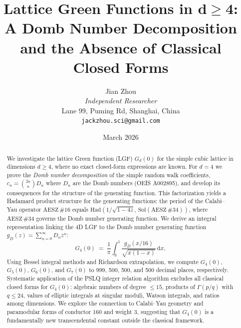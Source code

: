 \documentclass[12pt,a4paper]{article}
\numberwithin{equation}{section}
\theoremstyle{plain}
\theoremstyle{definition}
\theoremstyle{remark}
\newcommand{\dd}{\mathrm{d}}
\newcommand{\Had}{\mathrm{Had}}
\newcommand{\aesz}[1]{\mathrm{AESZ}\,\#\!{#1}}
\begin{document}
\title{\textbf{Lattice Green Functions in $\boldsymbol{d \geq 4}$:}\\[6pt]
\Large A Domb Number Decomposition and the Absence of Classical Closed Forms}
\author{Jian Zhou\\[4pt]
\textit{Independent Researcher}\\[2pt]
Lane 99, Puming Rd, Shanghai, China\\[2pt]
\texttt{jackzhou.sci@gmail.com}}
\date{March 2026}

\maketitle
\thispagestyle{fancy}

\begin{abstract}
We investigate the lattice Green function (LGF) $G_d(0)$ for the simple cubic lattice
in dimensions $d \geq 4$, where no exact closed-form expressions are known.
For $d = 4$ we prove the \emph{Domb number decomposition} of the simple random walk
coefficients, $c_n = \binom{2n}{n} D_n$ where $D_n$ are the Domb numbers (OEIS A002895),
and develop its consequences for the structure of the generating function.
This factorization yields a Hadamard product structure for the generating functions:
the period of the Calabi--Yau operator $\aesz{16}$ equals
$\Had(1/\sqrt{1-4z},\,\mathrm{Sol}(\aesz{34}))$, where $\aesz{34}$ governs the Domb number generating function.
We derive an integral representation linking the 4D LGF to the Domb number generating function
$g_D(z) = \sum_{n=0}^\infty D_n z^n$:
\[
  G_4(0) \;=\; \frac{1}{\pi} \int_0^1 \frac{g_D(x/16)}{\sqrt{x(1-x)}}\,\dd x,
\]
Using Bessel integral methods and Richardson extrapolation, we compute $G_4(0)$, $G_5(0)$,
$G_6(0)$, and $G_7(0)$ to 999, 500, 500, and 500 decimal places, respectively.
Systematic application of the PSLQ integer relation algorithm excludes all classical closed forms
for $G_4(0)$: algebraic numbers of degree $\leq 15$, products of $\Gamma(p/q)$ with $q \leq 24$,
values of elliptic integrals at singular moduli, Watson integrals, and ratios among dimensions.
We explore the connection to Calabi--Yau geometry and paramodular forms of conductor 160 and weight 3,
suggesting that $G_4(0)$ is a fundamentally new transcendental constant outside the classical framework.
\end{abstract}

\tableofcontents

\end{document}
